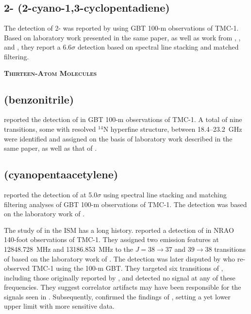 \documentclass[twocolumn]{aastex631}
\newcommand{\update}[1]{{#1}}
\begin{document}
	\subsection{\update{2- (2-cyano-1,3-cyclopentadiene)}}
	\label{2-C5H5CN}
	
	\update{The detection of 2- was reported by \citet{Lee:2021ud} using GBT 100-m observations of TMC-1.  Based on laboratory work presented in the same paper, as well as work from \citet{1978JMoSp..69..326F}, \citet{1987BCSJ..60..3903S}, and \citet{McCarthy:2021aa}, they report a 6.6$\sigma$ detection based on spectral line stacking and matched filtering.}
	
    
    \begin{center}
        \large
        \textsc{\textbf{\update{Thirteen-Atom Molecules}}}
        \label{13atoms}
        \normalsize
    \end{center}	
	
	\subsection{ (benzonitrile)}
	\label{C6H5CN}	
	
	\citet{McGuire:2018it} reported the detection of  in GBT 100-m observations of TMC-1.  A total of nine transitions, some with resolved $^{14}$N hyperfine structure, between 18.4--23.2~GHz were identified and assigned on the basis of laboratory work described in the same paper, as well as that of \citet{Wohlfart:2008hg}.
	
    \subsection{\update{ (cyanopentaacetylene)}}
    \label{HC11N}
    
    \update{\citet{Loomis:2021aa} reported the detection of \ce{HC11N} at 5.0$\sigma$ using spectral line stacking and matching filtering analyses of GBT 100-m observations of TMC-1.  The detection was based on the laboratory work of \citet{Travers:1996gs}.}
    
    \update{The study of  in the ISM has a long history.}  \citet{Bell:1997vj} reported a detection of  in NRAO 140-foot observations of TMC-1.  They assigned two emission features at 12848.728~MHz and 13186.853~MHz to the $J = 38\rightarrow37$ and $39\rightarrow38$ transitions of  based on the laboratory work of \citet{Travers:1996gs}.  The detection was later disputed by \citet{Loomis:2016js} who re-observed TMC-1 using the 100-m GBT.  They targeted six transitions of , including those originally reported by \citet{Bell:1997vj}, and detected no signal at any of these frequencies.  They suggest correlator artifacts may have been responsible for the signals seen in \citet{Bell:1997vj}.  Subsequently, \citet{Cordiner:2017dq} confirmed the findings of \citet{Loomis:2016js}, setting a yet lower upper limit with more sensitive data.	
	
\end{document}
